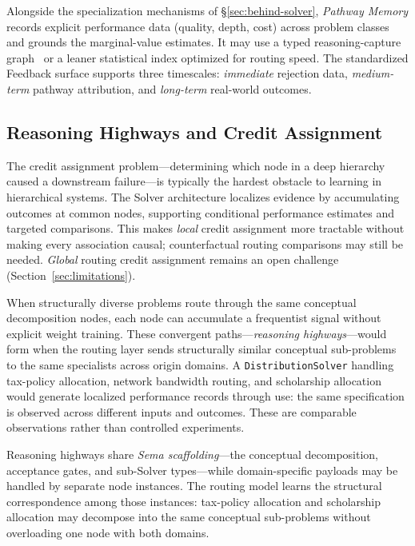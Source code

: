 \documentclass[11pt]{article}
\let\oldtexttt\texttt
\renewcommand{\texttt}[1]{\oldtexttt{\small #1}}
\begin{document}
Alongside the specialization mechanisms of \S\ref{sec:behind-solver}, \emph{Pathway Memory} records explicit performance data (quality, depth, cost) across problem classes and grounds the marginal-value estimates. It may use a typed reasoning-capture graph~\cite{westerberg2026understanding} or a leaner statistical index optimized for routing speed. The standardized Feedback surface supports three timescales: \emph{immediate} rejection data, \emph{medium-term} pathway attribution, and \emph{long-term} real-world outcomes.

\subsection{Reasoning Highways and Credit Assignment}
\label{sec:reuse-measurement}

The credit assignment problem---determining which node in a deep hierarchy caused a downstream failure---is typically the hardest obstacle to learning in hierarchical systems. The Solver architecture localizes evidence by accumulating outcomes at common nodes, supporting conditional performance estimates and targeted comparisons. This makes \emph{local} credit assignment more tractable without making every association causal; counterfactual routing comparisons may still be needed. \emph{Global} routing credit assignment remains an open challenge (Section~\ref{sec:limitations}).

When structurally diverse problems route through the same conceptual decomposition nodes, each node can accumulate a frequentist signal without explicit weight training. These convergent paths---\emph{reasoning highways}---would form when the routing layer sends structurally similar conceptual sub-problems to the same specialists across origin domains. A \texttt{DistributionSolver} handling tax-policy allocation, network bandwidth routing, and scholarship allocation would generate localized performance records through use: the same specification is observed across different inputs and outcomes. These are comparable observations rather than controlled experiments.

Reasoning highways share \emph{Sema scaffolding}---the conceptual decomposition, acceptance gates, and sub-Solver types---while domain-specific payloads may be handled by separate node instances. The routing model learns the structural correspondence among those instances: tax-policy allocation and scholarship allocation may decompose into the same conceptual sub-problems without overloading one node with both domains.
\end{document}
